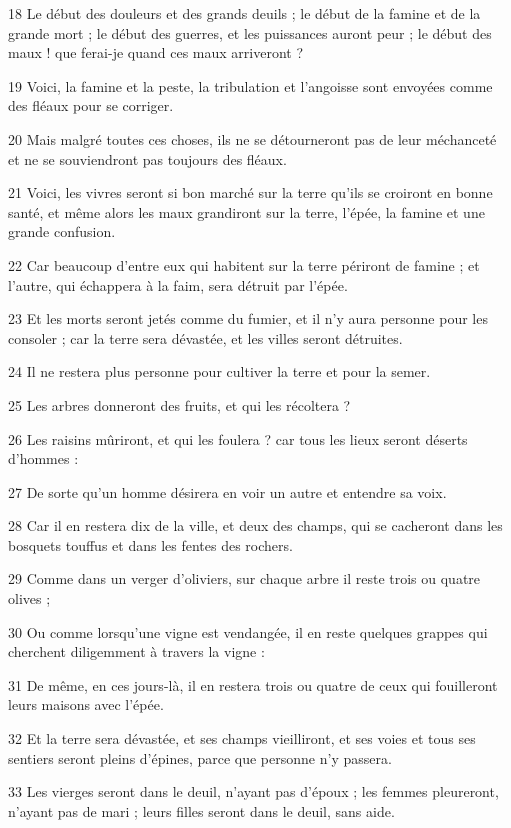 \par 18 Le début des douleurs et des grands deuils ; le début de la famine et de la grande mort ; le début des guerres, et les puissances auront peur ; le début des maux ! que ferai-je quand ces maux arriveront ?
\par 19 Voici, la famine et la peste, la tribulation et l'angoisse sont envoyées comme des fléaux pour se corriger.
\par 20 Mais malgré toutes ces choses, ils ne se détourneront pas de leur méchanceté et ne se souviendront pas toujours des fléaux.
\par 21 Voici, les vivres seront si bon marché sur la terre qu'ils se croiront en bonne santé, et même alors les maux grandiront sur la terre, l'épée, la famine et une grande confusion.
\par 22 Car beaucoup d'entre eux qui habitent sur la terre périront de famine ; et l'autre, qui échappera à la faim, sera détruit par l'épée.
\par 23 Et les morts seront jetés comme du fumier, et il n'y aura personne pour les consoler ; car la terre sera dévastée, et les villes seront détruites.
\par 24 Il ne restera plus personne pour cultiver la terre et pour la semer.
\par 25 Les arbres donneront des fruits, et qui les récoltera ?
\par 26 Les raisins mûriront, et qui les foulera ? car tous les lieux seront déserts d'hommes :
\par 27 De sorte qu'un homme désirera en voir un autre et entendre sa voix.
\par 28 Car il en restera dix de la ville, et deux des champs, qui se cacheront dans les bosquets touffus et dans les fentes des rochers.
\par 29 Comme dans un verger d'oliviers, sur chaque arbre il reste trois ou quatre olives ;
\par 30 Ou comme lorsqu'une vigne est vendangée, il en reste quelques grappes qui cherchent diligemment à travers la vigne :
\par 31 De même, en ces jours-là, il en restera trois ou quatre de ceux qui fouilleront leurs maisons avec l'épée.
\par 32 Et la terre sera dévastée, et ses champs vieilliront, et ses voies et tous ses sentiers seront pleins d'épines, parce que personne n'y passera.
\par 33 Les vierges seront dans le deuil, n'ayant pas d'époux ; les femmes pleureront, n'ayant pas de mari ; leurs filles seront dans le deuil, sans aide.
